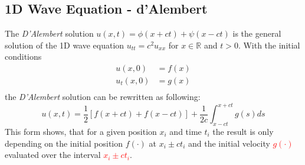 \subsection{1D Wave Equation - d'Alembert}\label{ssec:1d_wave_Al}
The \textit{D'Alembert} solution $u(x,t) = \phi(x+ct)+\psi(x-ct)$ is the general solution of the 1D wave equation $u_{tt}=c^2u_{xx}$ for $x \in \mathbb{R}$ and $t>0$. With the initial conditions
\begin{align*}
    u(x,0)   & = f(x) \\
    u_t(x,0) & = g(x) \\
\end{align*}
the \textit{D'Alembert} solution can be rewritten as following:
\begin{equation*}
    u(x,t)=\frac{1}{2}\left[f(x+ct)+f(x-ct)\right]+\frac{1}{2c}\int_{x-ct}^{x+ct}g(s)ds
\end{equation*}
This form shows, that for a given position $x_i$ and time $t_i$ the result is only depending on the initial position \textcolor{mathGreen}{$f(\cdot)$} at \textcolor{mathGreen}{$x_i\pm ct_i$} and the initial velocity \textcolor{red}{$g(\cdot)$} evaluated over the interval \textcolor{red}{$x_i\pm ct_i$}.
\begin{center}
\end{center}
